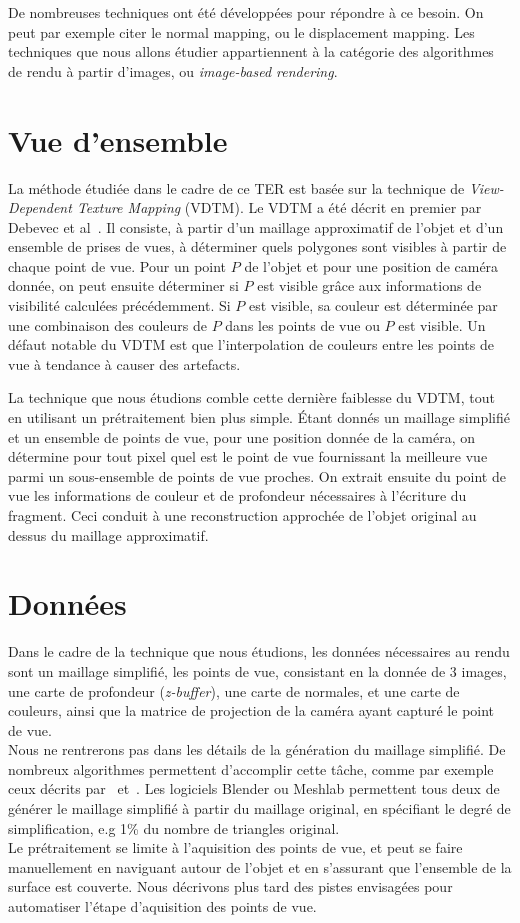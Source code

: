 De nombreuses techniques ont été développées pour répondre à ce besoin. On peut par exemple citer le normal mapping,
ou le displacement mapping. Les techniques que nous allons étudier appartiennent à la catégorie des algorithmes de
rendu à partir d'images, ou \emph{image-based rendering}.\\

\section{Vue d'ensemble}
La méthode étudiée dans le cadre de ce TER est basée sur la technique de \emph{View-Dependent Texture Mapping} (VDTM).
Le VDTM a été décrit en premier par Debevec et al~\cite{Debevec96}. Il consiste, à partir d'un maillage
approximatif de l'objet et d'un ensemble de prises de vues, à déterminer quels polygones sont visibles à partir
de chaque point de vue. Pour un point $P$ de l'objet et pour une position de caméra donnée, on peut ensuite déterminer si $P$
est visible grâce aux informations de visibilité calculées précédemment. Si $P$ est visible, sa couleur est déterminée
par une combinaison des couleurs de $P$ dans les points de vue ou $P$ est visible. Un défaut notable du VDTM est
que l'interpolation de couleurs entre les points de vue à tendance à causer des artefacts.

La technique que nous étudions comble cette dernière faiblesse du VDTM, tout en utilisant un prétraitement bien plus simple.
\'Etant donnés un maillage simplifié et un ensemble de points de vue, pour une position donnée de la caméra, on détermine pour tout pixel
quel est le point de vue fournissant la meilleure vue parmi un sous-ensemble de points de vue proches. On extrait ensuite
du point de vue les informations de couleur et de profondeur nécessaires à l'écriture du fragment. Ceci conduit à une
reconstruction approchée de l'objet original au dessus du maillage approximatif.

\section{Données}
Dans le cadre de la technique que nous étudions, les données nécessaires au rendu sont un maillage simplifié, les points de vue,
consistant en la donnée de 3 images, une carte de profondeur (\emph{z-buffer}), une carte de normales, et une carte de couleurs, ainsi
que la matrice de projection de la caméra ayant capturé le point de vue.\\
Nous ne rentrerons pas dans les détails de la génération du maillage simplifié. De nombreux algorithmes permettent d'accomplir
cette tâche, comme par exemple ceux décrits par~\cite{Hoppe96} et~\cite{Garland97}. Les logiciels Blender ou Meshlab permettent
tous deux de générer le maillage simplifié à partir du maillage original, en spécifiant le degré de simplification, e.g 1\% du nombre
de triangles original.\\
Le prétraitement se limite à l'aquisition des points de vue, et peut se faire manuellement en naviguant autour de l'objet et en s'assurant
que l'ensemble de la surface est couverte. Nous décrivons plus tard des pistes envisagées pour automatiser l'étape d'aquisition des points de vue.

